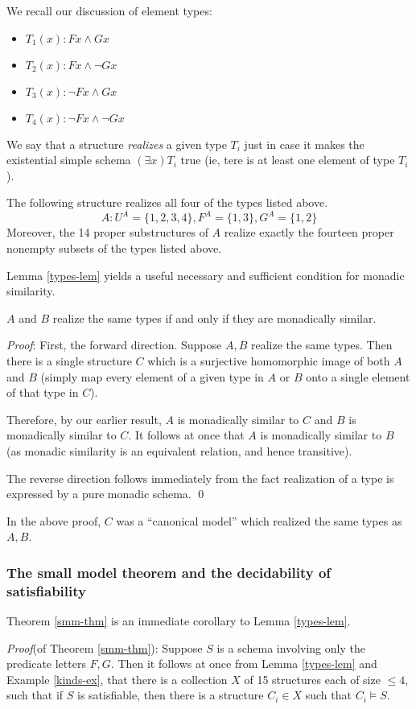 We recall our discussion of element types:
\begin{itemize}
\item $T_1(x): Fx\wedge Gx$
\item $T_2(x): Fx\wedge \neg Gx$
\item $T_3(x): \neg Fx\wedge Gx$
\item $T_4(x): \neg Fx\wedge \neg Gx$
\end{itemize}
We say that a structure {\em realizes} a given type $T_i$ just in case it
makes the existential simple schema $(\exists x)T_i$ true (ie, tere is at least one element of type $T_i$).
\begin{example}\label{kinds-ex}
The following structure realizes all four of the types listed above.
\[A: U^A = \{1,2,3,4\}, F^A =\{1,3\}, G^A=\{1,2\}\]
Moreover, the 14 proper substructures of $A$ realize exactly the fourteen
proper nonempty subsets of the types listed above.
\end{example}
Lemma \ref{types-lem} yields a useful necessary and sufficient condition for monadic similarity. 
\begin{lemma}\label{types-lem}
$A$ and $B$ realize the same types if and only if they are
monadically similar.
\end{lemma} 
\emph{Proof}:
First, the forward direction. Suppose $A, B$ realize the same types. Then there is a single structure $C$ which is a surjective homomorphic image of both $A$ and $B$ (simply map every element of a given type in $A$ or $B$ onto a single element of that type in $C$). 

Therefore, by our earlier result, $A$ is monadically similar to $C$ and $B$ is
monadically similar to $C.$ It follows at once that $A$ is monadically similar
to $B$ (as monadic similarity is an equivalent relation, and hence transitive). 

The reverse direction follows immediately from the fact realization of a type is expressed by a pure monadic schema. \qed

In the above proof, $C$ was a ``canonical model'' which realized the same types as $A, B$.  

\subsubsection*{The small model theorem and the decidability of satisfiability}

Theorem \ref{smm-thm} is an immediate corollary to Lemma \ref{types-lem}.

\emph{Proof}(of Theorem \ref{smm-thm}): Suppose $S$ is a schema involving only the predicate letters $F, G$. Then it follows at once from Lemma \ref{types-lem} and Example \ref{kinds-ex}, that there is a collection $X$ of 15 structures each of size $\leq 4$,
such that if $S$ is satisfiable, then there is a structure $C_i \in X$ such that $C_i \models S.$ 

